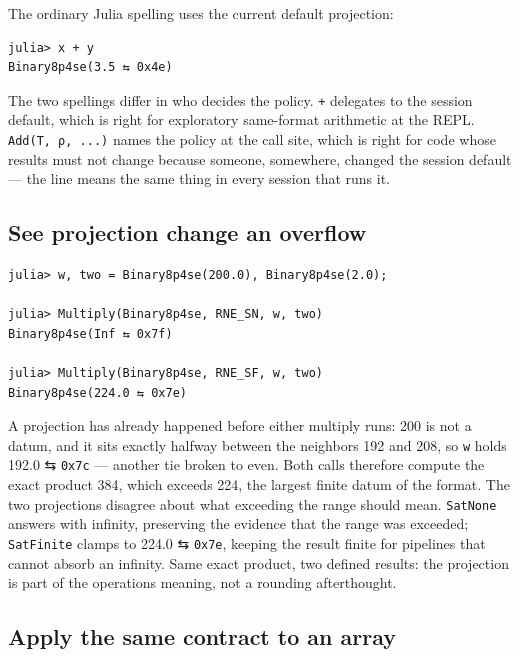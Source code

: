 The ordinary Julia spelling uses the current default projection:




\nopagebreak[4]
\begin{verbatim}
julia> x + y
Binary8p4se(3.5 ⇆ 0x4e)
\end{verbatim}



The two spellings differ in who decides the policy. \texttt{+} delegates to the session default, which is right for exploratory same-format arithmetic at the REPL. \texttt{Add(T, ρ, ...)} names the policy at the call site, which is right for code whose results must not change because someone, somewhere, changed the session default — the line means the same thing in every session that runs it.



\subsection{See projection change an overflow}



\label{16452669833691222730}{}



\begin{verbatim}
julia> w, two = Binary8p4se(200.0), Binary8p4se(2.0);

julia> Multiply(Binary8p4se, RNE_SN, w, two)
Binary8p4se(Inf ⇆ 0x7f)

julia> Multiply(Binary8p4se, RNE_SF, w, two)
Binary8p4se(224.0 ⇆ 0x7e)
\end{verbatim}



A projection has already happened before either multiply runs: 200 is not a datum, and it sits exactly halfway between the neighbors 192 and 208, so \texttt{w} holds 192.0 ⇆ \texttt{0x7c} — another tie broken to even. Both calls therefore compute the exact product 384, which exceeds 224, the largest finite datum of the format. The two projections disagree about what exceeding the range should mean. \texttt{SatNone} answers with infinity, preserving the evidence that the range was exceeded; \texttt{SatFinite} clamps to 224.0 ⇆ \texttt{0x7e}, keeping the result finite for pipelines that cannot absorb an infinity. Same exact product, two defined results: the projection is part of the operation{\textquotesingle}s meaning, not a rounding afterthought.



\subsection{Apply the same contract to an array}



